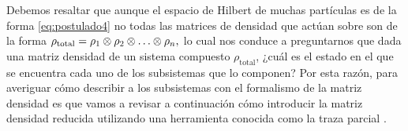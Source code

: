 Debemos resaltar que aunque el espacio de Hilbert de muchas partículas 
es de la forma \eqref{eq:postulado4} no todas las matrices de densidad
que actúan sobre son de la forma 
$\rho_{\text{total}}=\rho_1\otimes \rho_2\otimes \ldots\otimes \rho_n,$ 
lo cual nos conduce a preguntarnos que dada una matriz densidad de
un sistema compuesto $\rho_{\text{total}}$, ¿cuál es el estado 
en el que se encuentra cada uno de los subsistemas que lo componen?
Por esta razón, para averiguar cómo describir a los subsistemas con 
el formalismo de la matriz densidad es que vamos a revisar a continuación
cómo introducir la matriz densidad reducida utilizando una herramienta
conocida como la traza parcial \cite{nielsen_chuang_2011}. 

